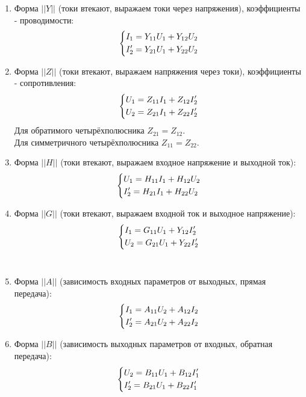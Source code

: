 \documentclass[a4paper,12pt]{report}
\begin{document}
\begin{enumerate}
  \item Форма $||Y||$ (токи втекают, выражаем токи через напряжения), коэффициенты - проводимости:
  \begin{equation}
  \left\{
\begin{aligned}
&I_1=Y_{11}U_1+Y_{12}U_2\\
&I_2'=Y_{21}U_1+Y_{22}U_2 \notag
\end{aligned}
\right.
\end{equation}

  \item Форма $||Z||$ (токи втекают, выражаем напряжения через токи), коэффициенты - сопротивления:
  \begin{equation}
    \left\{
\begin{aligned}
&U_1=Z_{11}I_1+Z_{12}I_2'\\
&U_2=Z_{21}I_1+Z_{22}I_2'  \notag
\end{aligned}
\right.
\end{equation}
Для обратимого четырёхполюсника $Z_{21}=Z_{12}$.\\
Для симметричного четырёхполюсника $Z_{11}=Z_{22}$.\\

  \item Форма $||H||$ (токи втекают, выражаем входное напряжение и выходной ток):
  \begin{equation}
  \left\{
\begin{aligned}
&U_1=H_{11}I_1+H_{12}U_2\\
&I_2'=H_{21}I_1+H_{22}U_2  \notag
\end{aligned}
\right.
\end{equation}
  \item Форма $||G||$ (токи втекают, выражаем входной ток и выходное напряжение):
  \begin{equation}
  \left\{
\begin{aligned}
&I_1=G_{11}U_1+Y_{12}I_2'\\
&U_2=G_{21}U_1+Y_{22}I_2' \notag
\end{aligned}
\right.
\end{equation}
\\
  \item Форма $||A||$ (зависимость входных параметров от выходных, прямая передача):
  \begin{equation}
\left\{
\begin{aligned}
&I_1=A_{11}U_2+A_{12}I_2\\
&I_2'=A_{21}U_2+A_{22}I_2 \notag
\end{aligned}
\right.
\end{equation}
  \item Форма $||B||$ (зависимость выходных параметров от входных, обратная передача): 
  \begin{equation}
  \left\{
\begin{aligned}
&U_2=B_{11}U_1+B_{12}I_1'\\
&I_2'=B_{21}U_1+B_{22}I_1'  \notag
\end{aligned}
\right.
\end{equation}
\end{enumerate}
\end{document}
